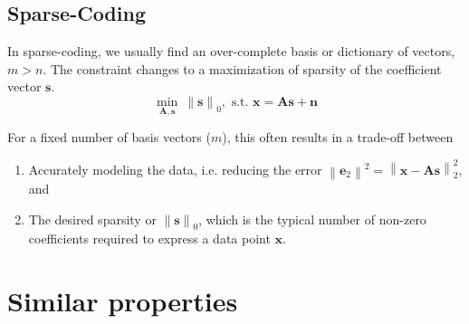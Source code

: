 \documentclass[10pt,onecolumn]{article}
\begin{document}
    \subsection{Sparse-Coding}
    \label{sec:def_sparse_coding}
    In sparse-coding, we usually find an over-complete basis or dictionary of vectors, $m>n$.
    The constraint changes to a maximization of sparsity of the coefficient vector $\mathbf{s}$.
    \begin{equation}
        \min_{\mathbf{A,s}}~\left\lVert\mathbf{s}\right\rVert_{0}, \mbox{ s.t. } \mathbf{x} = \mathbf{A}\mathbf{s} + \mathbf{n}
        \label{eqn:}
    \end{equation}

    For a fixed number of basis vectors ($m$), this often results in a trade-off between
    \begin{enumerate}
        \item Accurately modeling the data, i.e. reducing the error $\left\lVert\mathbf{e}_2\right\rVert^2 = \left\lVert\mathbf{x} - \mathbf{A}\mathbf{s}\right\rVert_2^2$, and
        \item The desired sparsity or $\left\lVert{\mathbf{s}}\right\rVert_0$, which is the typical number of non-zero coefficients required to express a data point $\mathbf{x}$.
    \end{enumerate}

    \section{Similar properties}
    \label{sec:examples_similarities}
\end{document}
